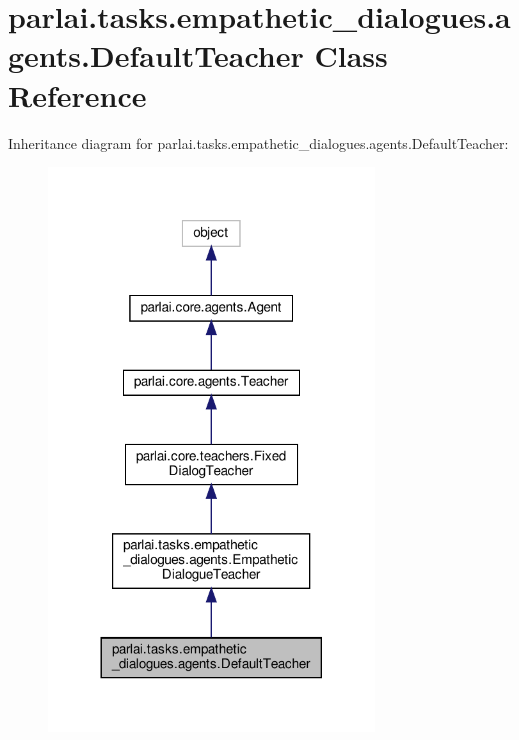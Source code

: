\hypertarget{classparlai_1_1tasks_1_1empathetic__dialogues_1_1agents_1_1DefaultTeacher}{}\section{parlai.\+tasks.\+empathetic\+\_\+dialogues.\+agents.\+Default\+Teacher Class Reference}
\label{classparlai_1_1tasks_1_1empathetic__dialogues_1_1agents_1_1DefaultTeacher}


Inheritance diagram for parlai.\+tasks.\+empathetic\+\_\+dialogues.\+agents.\+Default\+Teacher\+:
\nopagebreak
\begin{figure}[H]
\begin{center}
\leavevmode
\includegraphics[width=245pt]{classparlai_1_1tasks_1_1empathetic__dialogues_1_1agents_1_1DefaultTeacher__inherit__graph}
\end{center}
\end{figure}


